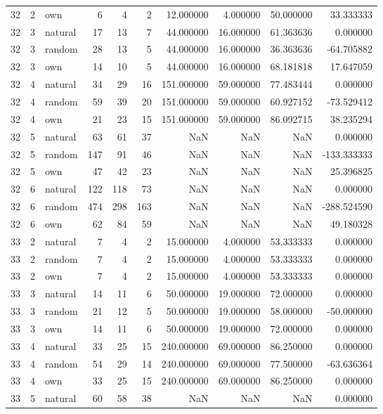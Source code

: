 \begin{table}[htbp]
\begin{tabular}{rrlrrrrrrr}
32 & 2 & own & 6 & 4 & 2 & 12.000000 & 4.000000 & 50.000000 & 33.333333 \\
32 & 3 & natural & 17 & 13 & 7 & 44.000000 & 16.000000 & 61.363636 & 0.000000 \\
32 & 3 & random & 28 & 13 & 5 & 44.000000 & 16.000000 & 36.363636 & -64.705882 \\
32 & 3 & own & 14 & 10 & 5 & 44.000000 & 16.000000 & 68.181818 & 17.647059 \\
32 & 4 & natural & 34 & 29 & 16 & 151.000000 & 59.000000 & 77.483444 & 0.000000 \\
32 & 4 & random & 59 & 39 & 20 & 151.000000 & 59.000000 & 60.927152 & -73.529412 \\
32 & 4 & own & 21 & 23 & 15 & 151.000000 & 59.000000 & 86.092715 & 38.235294 \\
32 & 5 & natural & 63 & 61 & 37 & NaN & NaN & NaN & 0.000000 \\
32 & 5 & random & 147 & 91 & 46 & NaN & NaN & NaN & -133.333333 \\
32 & 5 & own & 47 & 42 & 23 & NaN & NaN & NaN & 25.396825 \\
32 & 6 & natural & 122 & 118 & 73 & NaN & NaN & NaN & 0.000000 \\
32 & 6 & random & 474 & 298 & 163 & NaN & NaN & NaN & -288.524590 \\
32 & 6 & own & 62 & 84 & 59 & NaN & NaN & NaN & 49.180328 \\
33 & 2 & natural & 7 & 4 & 2 & 15.000000 & 4.000000 & 53.333333 & 0.000000 \\
33 & 2 & random & 7 & 4 & 2 & 15.000000 & 4.000000 & 53.333333 & 0.000000 \\
33 & 2 & own & 7 & 4 & 2 & 15.000000 & 4.000000 & 53.333333 & 0.000000 \\
33 & 3 & natural & 14 & 11 & 6 & 50.000000 & 19.000000 & 72.000000 & 0.000000 \\
33 & 3 & random & 21 & 12 & 5 & 50.000000 & 19.000000 & 58.000000 & -50.000000 \\
33 & 3 & own & 14 & 11 & 6 & 50.000000 & 19.000000 & 72.000000 & 0.000000 \\
33 & 4 & natural & 33 & 25 & 15 & 240.000000 & 69.000000 & 86.250000 & 0.000000 \\
33 & 4 & random & 54 & 29 & 14 & 240.000000 & 69.000000 & 77.500000 & -63.636364 \\
33 & 4 & own & 33 & 25 & 15 & 240.000000 & 69.000000 & 86.250000 & 0.000000 \\
33 & 5 & natural & 60 & 58 & 38 & NaN & NaN & NaN & 0.000000 \\

\end{tabular}
\end{table}

